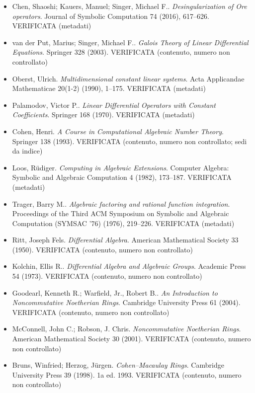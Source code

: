 \begin{itemize}[itemsep=2pt,leftmargin=1.2em,font=\small]
\item Chen, Shaoshi; Kauers, Manuel; Singer, Michael F.. \emph{Desingularization of {O}re operators}. Journal of Symbolic Computation 74 (2016), 617--626. \textsf{\footnotesize VERIFICATA (metadati)}
\item van der Put, Marius; Singer, Michael F.. \emph{Galois Theory of Linear Differential Equations}. Springer 328 (2003). \textsf{\footnotesize VERIFICATA (contenuto, numero non controllato)}
\item Oberst, Ulrich. \emph{Multidimensional constant linear systems}. Acta Applicandae Mathematicae 20(1-2) (1990), 1--175. \textsf{\footnotesize VERIFICATA (metadati)}
\item Palamodov, Victor P.. \emph{Linear Differential Operators with Constant Coefficients}. Springer 168 (1970). \textsf{\footnotesize VERIFICATA (metadati)}
\item Cohen, Henri. \emph{A Course in Computational Algebraic Number Theory}. Springer 138 (1993). \textsf{\footnotesize VERIFICATA (contenuto, numero non controllato; sedi da indice)}
\item Loos, R{\"u}diger. \emph{Computing in Algebraic Extensions}. Computer Algebra: Symbolic and Algebraic Computation 4 (1982), 173--187. \textsf{\footnotesize VERIFICATA (metadati)}
\item Trager, Barry M.. \emph{Algebraic factoring and rational function integration}. Proceedings of the Third ACM Symposium on Symbolic and Algebraic Computation (SYMSAC '76) (1976), 219--226. \textsf{\footnotesize VERIFICATA (metadati)}
\item Ritt, Joseph Fels. \emph{Differential Algebra}. American Mathematical Society 33 (1950). \textsf{\footnotesize VERIFICATA (contenuto, numero non controllato)}
\item Kolchin, Ellis R.. \emph{Differential Algebra and Algebraic Groups}. Academic Press 54 (1973). \textsf{\footnotesize VERIFICATA (contenuto, numero non controllato)}
\item Goodearl, Kenneth R.; Warfield, Jr., Robert B.. \emph{An Introduction to Noncommutative Noetherian Rings}. Cambridge University Press 61 (2004). \textsf{\footnotesize VERIFICATA (contenuto, numero non controllato)}
\item McConnell, John C.; Robson, J. Chris. \emph{Noncommutative Noetherian Rings}. American Mathematical Society 30 (2001). \textsf{\footnotesize VERIFICATA (contenuto, numero non controllato)}
\item Bruns, Winfried; Herzog, J{\"u}rgen. \emph{Cohen--Macaulay Rings}. Cambridge University Press 39 (1998). \textsf{\footnotesize 1a ed. 1993. VERIFICATA (contenuto, numero non controllato)}

\end{itemize}
